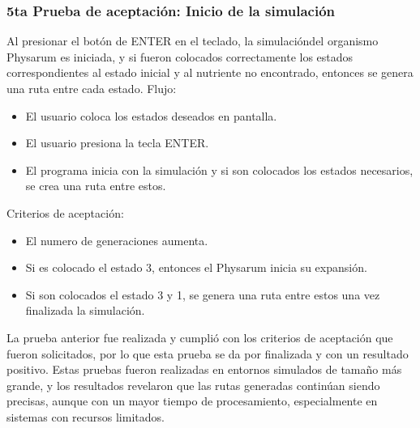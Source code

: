     \subsubsection{5ta Prueba de aceptaci\'on: Inicio de la simulaci\'on}
    Al presionar el bot\'on de ENTER en el teclado, la simulaci\'ondel organismo Physarum es iniciada, y si fueron colocados
        correctamente los estados correspondientes al estado inicial
        y al nutriente no encontrado, entonces se genera una ruta
        entre cada estado.
    \vskip 0.5cm
    Flujo:
    \begin{itemize}
        \item El usuario coloca los estados deseados en pantalla.
        \item El usuario presiona la tecla ENTER.
        \item El programa inicia con la simulaci\'on y si son colocados
        los estados necesarios, se crea una ruta entre estos.
    \end{itemize}
    \vskip 0.5cm
    Criterios de aceptaci\'on:
    \begin{itemize}
        \item El numero de generaciones aumenta.
        \item Si es colocado el estado 3, entonces el Physarum inicia
        su expansi\'on.
        \item Si son colocados el estado 3 y 1, se genera una ruta entre
        estos una vez finalizada la simulaci\'on.
    \end{itemize}
    \vskip 0.5cm
    La prueba anterior fue realizada y cumpli\'o con los criterios
        de aceptaci\'on que fueron solicitados, por lo que esta prueba
        se da por finalizada y con un resultado positivo.
    \vskip 0.5cm
    Estas pruebas fueron realizadas en entornos simulados de
        tama\~no m\'as grande, y los resultados revelaron que las rutas
        generadas contin\'uan siendo precisas, aunque con un mayor
        tiempo de procesamiento, especialmente en sistemas con
        recursos limitados.